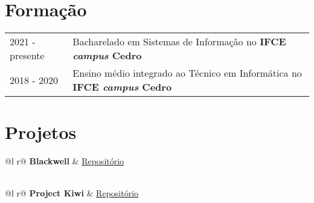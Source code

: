 \documentclass[a4paper,12pt]{article}
\begin{document}
\section{Formação}
\begin{tabularx}{\linewidth}{@{}l X@{}}	
2021 - presente & Bacharelado em Sistemas de Informação no \textbf{IFCE \textit{campus} Cedro} \\ 

2018 - 2020 & Ensino médio integrado ao Técnico em Informática no \textbf{IFCE \textit{campus} Cedro} \\

\end{tabularx}

\section{Projetos}

\begin{tabularx}{\linewidth}{ @{}l r@{} }
\textbf{Blackwell} & \hfill \href{https://github.com/helpmeagain/blackwell}{Repositório} \\[3.75pt]
  \\
\end{tabularx}

\begin{tabularx}{\linewidth}{ @{}l r@{} }
\textbf{Project Kiwi} & \hfill \href{https://github.com/helpmeagain/project-kiwi}{Repositório} \\[3.75pt]
  \\
\end{tabularx}

\end{document}
